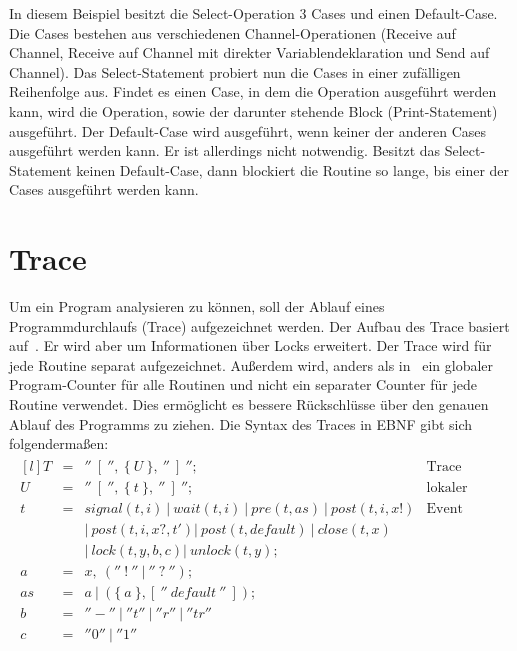 In diesem Beispiel besitzt die Select-Operation 3 Cases und einen Default-Case.
Die Cases bestehen aus verschiedenen Channel-Operationen (Receive auf Channel, 
Receive auf Channel mit direkter Variablendeklaration und Send auf Channel).
Das Select-Statement probiert nun die Cases in einer zufälligen Reihenfolge 
aus. Findet es einen Case, in dem die Operation ausgeführt werden kann, wird 
die Operation, sowie der darunter stehende Block (Print-Statement) ausgeführt.
Der Default-Case wird ausgeführt, wenn keiner der anderen Cases ausgeführt 
werden kann. Er ist allerdings nicht notwendig. Besitzt das Select-Statement 
keinen Default-Case, dann blockiert die Routine so lange, bis einer der Cases 
ausgeführt werden kann.


\section{Trace}\label{chap:background-sec:trace}
Um ein Program analysieren zu können, soll der Ablauf eines Programmdurchlaufs
(Trace) aufgezeichnet werden. Der Aufbau des Trace basiert auf~\cite{PPDP18}. 
Er wird aber um Informationen 
über Locks erweitert. Der Trace wird für jede Routine
separat aufgezeichnet. Außerdem wird, anders als in~\cite{PPDP18} ein globaler
Program-Counter für alle Routinen und nicht ein separater Counter für jede 
Routine verwendet. Dies ermöglicht es bessere Rückschlüsse über den genauen 
Ablauf des Programms zu ziehen.
Die Syntax des Traces in EBNF gibt sich 
folgendermaßen:
\begin{align*}
  \begin{matrix*}[l]
    T & = & ''\ [\ '',\ \{\ U\ \},\ ''\ ]\ ''; & \text{Trace}\\
    U & = & ''\ [\ '',\ \{\ t\ \},\ ''\ ]\ ''; & \text{lokaler Trace} \\
    t & = & signal(t, i)\ |\ wait(t, i)\ |\ pre(t, as)\ |\ post(t, i, x!) & \text{Event}\\
      &   & |\ post(t, i, x?, t') |\ post(t, default)\ 
      |\ close(t, x)\  
      & \\
      &   & |\ lock(t, y, b, c) |\ unlock(t, y); & \\
    a & = & x,\ (''\ !\ ''\ |\ ''\ ?\ ''); & \\
    as & = & a\ |\ (\{\ a\ \}, [\ ''\ default\ ''\ ]); & \\
    b & = & ''-''\ |\ ''t''\ |\ ''r''\ |\ ''tr'' & \\
    c & = & ''0''\ |\ ''1''
  \end{matrix*}
\end{align*}
